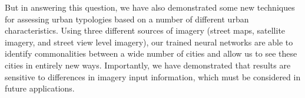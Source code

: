 \documentclass[10pt,letterpaper]{article}
\begin{document}
But in answering this question, we have also demonstrated some new techniques for assessing urban typologies based on a number of different urban characteristics. Using three different sources of imagery (street maps, satellite imagery, and street view level imagery), our trained neural networks are able to identify commonalities between a wide number of cities and allow us to see these cities in entirely new ways. Importantly, we have demonstrated that results are sensitive to differences in imagery input information, which must be considered in future applications. 






\nolinenumbers
\end{document}
